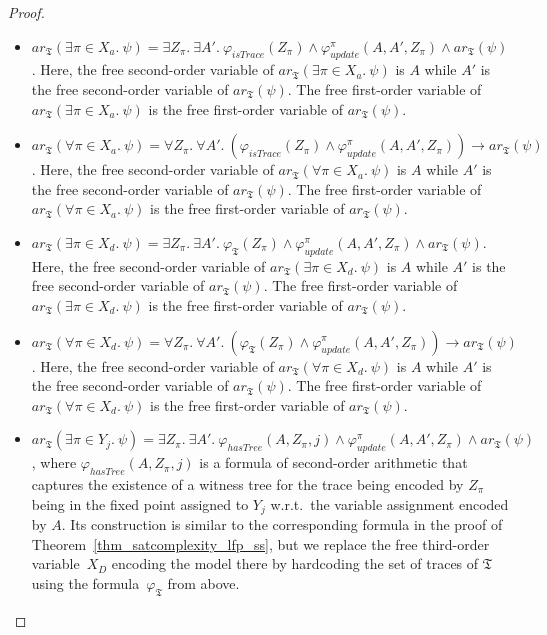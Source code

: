 \documentclass[dvipsnames,10pt,a4paper]{amsart}
\theoremstyle{definition}
\theoremstyle{remark}
\renewcommand{\phi}{\varphi}
\newcommand{\univar}{X_a}
\newcommand{\unidisvar}{X_d}
\newcommand{\tsys}{\mathfrak{T}}
\newcommand{\arithmetize}{{\mathit{ar}}}
\newcommand{\istrace}{\mathit{isTrace}}
\newcommand{\update}{\mathit{update}}
\newcommand{\hastree}{\mathit{hasTree}}
\begin{document}
\begin{proof}
\begin{itemize}
    \item $\arithmetize_\tsys(\exists\pi\in \univar.\ \psi) = \exists Z_\pi.\  \exists A'.\ \phi_{\istrace}(Z_\pi) \wedge \phi_\update^\pi(A,A',Z_\pi) \wedge \arithmetize_\tsys(\psi)$. 
    Here, the free second-order variable of $\arithmetize_\tsys(\exists\pi\in \univar.\ \psi)$ is $A$ while $A'$ is the free second-order variable of $\arithmetize_\tsys(\psi)$. The free first-order variable of $\arithmetize_\tsys(\exists\pi\in \univar.\ \psi)$ is the free first-order variable of $\arithmetize_\tsys(\psi)$.
    
    \item $\arithmetize_\tsys(\forall\pi\in \univar.\ \psi) = \forall Z_\pi.\ \forall A'.\ (\phi_{\istrace}(Z_\pi) \wedge \phi_\update^\pi(A,A',Z_\pi) )\rightarrow \arithmetize_\tsys(\psi)$. 
    Here, the free second-order variable of $\arithmetize_\tsys(\forall\pi\in \univar.\ \psi)$ is $A$ while $A'$ is the free second-order variable of $\arithmetize_\tsys(\psi)$. The free first-order variable of $\arithmetize_\tsys(\forall\pi\in \univar.\ \psi)$ is the free first-order variable of $\arithmetize_\tsys(\psi)$.

    \item $\arithmetize_\tsys(\exists\pi\in \unidisvar.\ \psi) = \exists Z_\pi.\  \exists A'.\ \phi_\tsys(Z_\pi) \wedge \phi_\update^\pi(A,A',Z_\pi) \wedge \arithmetize_\tsys(\psi)$. 
    Here, the free second-order variable of $\arithmetize_\tsys(\exists\pi\in \unidisvar.\ \psi)$ is $A$ while $A'$ is the free second-order variable of $\arithmetize_\tsys(\psi)$. The free first-order variable of $\arithmetize_\tsys(\exists\pi\in \unidisvar.\ \psi)$ is the free first-order variable of $\arithmetize_\tsys(\psi)$.
    
    \item $\arithmetize_\tsys(\forall\pi\in \unidisvar.\ \psi) = \forall Z_\pi.\ \forall A'.\ (\phi_\tsys(Z_\pi) \wedge \phi_\update^\pi(A,A',Z_\pi) )\rightarrow \arithmetize_\tsys(\psi)$. 
    Here, the free second-order variable of $\arithmetize_\tsys(\forall\pi\in \unidisvar.\ \psi)$ is $A$ while $A'$ is the free second-order variable of $\arithmetize_\tsys(\psi)$. The free first-order variable of $\arithmetize_\tsys(\forall\pi\in \unidisvar.\ \psi)$ is the free first-order variable of $\arithmetize_\tsys(\psi)$.


    \item $\arithmetize_\tsys(\exists\pi\in Y_j.\ \psi) = \exists Z_\pi.\ \exists A'.\ \phi_\hastree(A,Z_\pi,j) \wedge \phi_\update^\pi(A,A',Z_\pi) \wedge \arithmetize_\tsys(\psi)$, where $\phi_\hastree(A,Z_\pi,j)$ is a formula of second-order arithmetic that captures the existence of a witness tree for the trace being encoded by $Z_\pi$ being in the fixed point assigned to $Y_j$ w.r.t.\ the variable assignment encoded by $A$. Its construction is similar to the corresponding formula in the proof of Theorem~\ref{thm_satcomplexity_lfp_ss}, but we replace the free third-order variable~$X_D$ encoding the model there by hardcoding the set of traces of $\tsys$ using the formula~$\phi_\tsys$ from above.
   

\end{itemize}
\end{proof}
\end{document}
